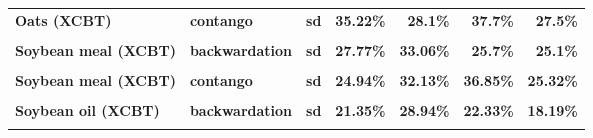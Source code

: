 \documentclass[
  authoryear,
  preprint,
  3p]{elsarticle}
\begin{document}
\begin{longtable}[t]{>{}l>{}l>{}l>{}r>{}r>{}r>{}r}
\textbf{Oats (XCBT)} & \textbf{contango} & \textbf{sd} & \textcolor[HTML]{4285f4}{\textbf{35.22\%}} & \textcolor[HTML]{4285f4}{\textbf{28.1\%}} & \textcolor[HTML]{4285f4}{\textbf{37.7\%}} & \textcolor[HTML]{4285f4}{\textbf{27.5\%}}\\
\textbf{\cellcolor{gray!10}{Soybean meal (XCBT)}} & \textbf{\cellcolor{gray!10}{backwardation}} & \textbf{\cellcolor{gray!10}{mean}} & \textcolor[HTML]{4285f4}{\textbf{\cellcolor{gray!10}{13.15\%}}} & \textcolor[HTML]{4285f4}{\textbf{\cellcolor{gray!10}{8.22\%}}} & \textcolor[HTML]{4285f4}{\textbf{\cellcolor{gray!10}{16.04\%}}} & \textcolor[HTML]{4285f4}{\textbf{\cellcolor{gray!10}{-3.52\%}}}\\
\textbf{Soybean meal (XCBT)} & \textbf{backwardation} & \textbf{sd} & \textcolor[HTML]{4285f4}{\textbf{27.77\%}} & \textcolor[HTML]{4285f4}{\textbf{33.06\%}} & \textcolor[HTML]{4285f4}{\textbf{25.7\%}} & \textcolor[HTML]{4285f4}{\textbf{25.1\%}}\\
\addlinespace
\textbf{\cellcolor{gray!10}{Soybean meal (XCBT)}} & \textbf{\cellcolor{gray!10}{contango}} & \textbf{\cellcolor{gray!10}{mean}} & \textcolor[HTML]{4285f4}{\textbf{\cellcolor{gray!10}{1.52\%}}} & \textcolor[HTML]{4285f4}{\textbf{\cellcolor{gray!10}{15.91\%}}} & \textcolor[HTML]{4285f4}{\textbf{\cellcolor{gray!10}{2.32\%}}} & \textcolor[HTML]{4285f4}{\textbf{\cellcolor{gray!10}{2.22\%}}}\\
\textbf{Soybean meal (XCBT)} & \textbf{contango} & \textbf{sd} & \textcolor[HTML]{4285f4}{\textbf{24.94\%}} & \textcolor[HTML]{4285f4}{\textbf{32.13\%}} & \textcolor[HTML]{4285f4}{\textbf{36.85\%}} & \textcolor[HTML]{4285f4}{\textbf{25.32\%}}\\
\textbf{\cellcolor{gray!10}{Soybean oil (XCBT)}} & \textbf{\cellcolor{gray!10}{backwardation}} & \textbf{\cellcolor{gray!10}{mean}} & \textcolor[HTML]{4285f4}{\textbf{\cellcolor{gray!10}{14.79\%}}} & \textcolor[HTML]{4285f4}{\textbf{\cellcolor{gray!10}{14.62\%}}} & \textcolor[HTML]{4285f4}{\textbf{\cellcolor{gray!10}{20.34\%}}} & \textcolor[HTML]{4285f4}{\textbf{\cellcolor{gray!10}{-9.44\%}}}\\
\textbf{Soybean oil (XCBT)} & \textbf{backwardation} & \textbf{sd} & \textcolor[HTML]{4285f4}{\textbf{21.35\%}} & \textcolor[HTML]{4285f4}{\textbf{28.94\%}} & \textcolor[HTML]{4285f4}{\textbf{22.33\%}} & \textcolor[HTML]{4285f4}{\textbf{18.19\%}}\\
\textbf{\cellcolor{gray!10}{Soybean oil (XCBT)}} & \textbf{\cellcolor{gray!10}{contango}} & \textbf{\cellcolor{gray!10}{mean}} & \textcolor[HTML]{4285f4}{\textbf{\cellcolor{gray!10}{-2.68\%}}} & \textcolor[HTML]{4285f4}{\textbf{\cellcolor{gray!10}{16.62\%}}} & \textcolor[HTML]{4285f4}{\textbf{\cellcolor{gray!10}{-10.01\%}}} & \textcolor[HTML]{4285f4}{\textbf{\cellcolor{gray!10}{-4.12\%}}}\\

\end{longtable}
\end{document}
